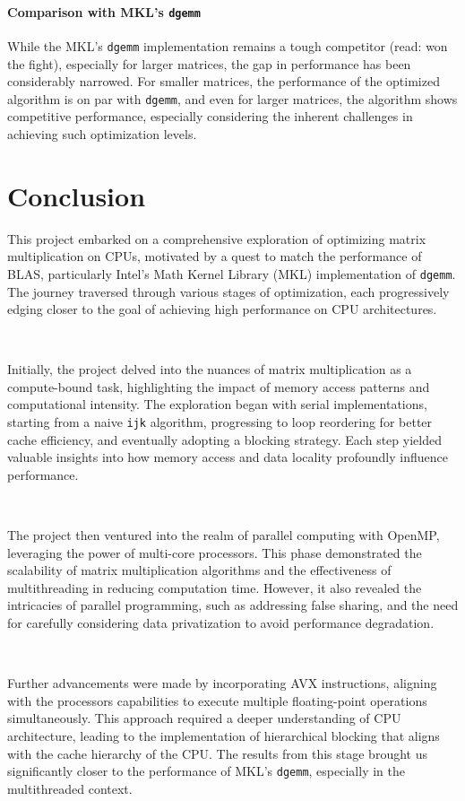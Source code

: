 \documentclass{article}
\begin{document}
\paragraph*{Comparison with MKL's \texttt{dgemm}} While the MKL's \texttt{dgemm} implementation 
remains a tough competitor (read: won the fight), especially for larger matrices, 
the gap in performance has been considerably narrowed. For smaller matrices, the performance 
of the optimized algorithm is on par with \texttt{dgemm}, and even for larger matrices, 
the algorithm shows competitive performance, especially considering the inherent challenges in achieving such optimization levels.

\section{Conclusion}
This project embarked on a comprehensive exploration of optimizing matrix multiplication on CPUs, 
motivated by a quest to match the performance of BLAS, particularly Intel's Math Kernel Library (MKL) 
implementation of \texttt{dgemm}. The journey traversed through various stages of optimization, 
each progressively edging closer to the goal of achieving high performance on CPU architectures.

\

\noindent Initially, the project delved into the nuances of matrix multiplication as a compute-bound task, 
highlighting the impact of memory access patterns and computational intensity. The exploration began 
with serial implementations, starting from a naive \texttt{ijk} algorithm, progressing to 
loop reordering for better cache efficiency, and eventually adopting a blocking strategy. 
Each step yielded valuable insights into how memory access and data locality profoundly influence performance.

\

\noindent The project then ventured into the realm of parallel computing with OpenMP, 
leveraging the power of multi-core processors. This phase demonstrated the scalability of matrix multiplication 
algorithms and the effectiveness of multithreading in reducing computation time. However, it also revealed the intricacies 
of parallel programming, such as addressing false sharing, and the need for carefully considering data privatization to 
avoid performance degradation.

\

\noindent Further advancements were made by incorporating AVX instructions, aligning with the processors capabilities to 
execute multiple floating-point operations simultaneously. This approach required a deeper understanding of CPU architecture, 
leading to the implementation of hierarchical blocking that aligns with the cache hierarchy of the CPU. The results from 
this stage brought us significantly closer to the performance of MKL's \texttt{dgemm}, especially in the multithreaded context.
\end{document}
